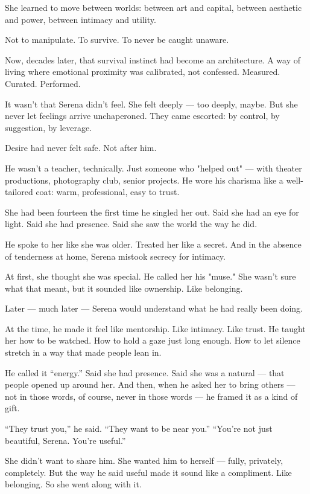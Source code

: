 She learned to move between worlds:
between art and capital, between aesthetic and power, between intimacy and utility.

Not to manipulate.
To survive.
To never be caught unaware.

Now, decades later, that survival instinct had become an architecture.
A way of living where emotional proximity was calibrated, not confessed.
Measured. Curated. Performed.

It wasn’t that Serena didn’t feel.
She felt deeply — too deeply, maybe.
But she never let feelings arrive unchaperoned.
They came escorted: by control, by suggestion, by leverage.

Desire had never felt safe.
Not after him.

He wasn’t a teacher, technically.
Just someone who "helped out" — with theater productions, photography club, senior projects.
He wore his charisma like a well-tailored coat: warm, professional, easy to trust.

She had been fourteen the first time he singled her out.
Said she had an eye for light.
Said she had presence.
Said she saw the world the way he did.

He spoke to her like she was older.
Treated her like a secret.
And in the absence of tenderness at home, Serena mistook secrecy for intimacy.

At first, she thought she was special.
He called her his "muse."
She wasn’t sure what that meant, but it sounded like ownership.
Like belonging.

Later — much later — Serena would understand what he had really been doing.

At the time, he made it feel like mentorship. Like intimacy. Like trust.
He taught her how to be watched.
How to hold a gaze just long enough.
How to let silence stretch in a way that made people lean in.

He called it “energy.”
Said she had presence.
Said she was a natural — that people opened up around her.
And then, when he asked her to bring others —
not in those words, of course, never in those words —
he framed it as a kind of gift.

“They trust you,” he said.
“They want to be near you.”
“You’re not just beautiful, Serena. You’re useful.”

She didn’t want to share him.
She wanted him to herself — fully, privately, completely.
But the way he said useful made it sound like a compliment.
Like belonging.
So she went along with it.

